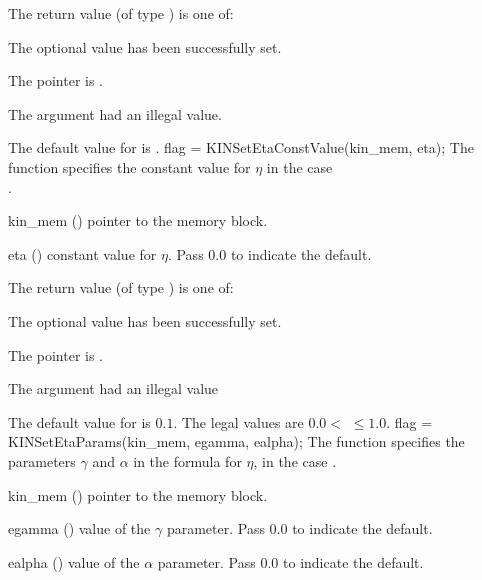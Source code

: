 {
  The return value  (of type ) is one of:
  \begin{args}
  \item[\Id{KIN\_SUCCESS}] 
    The optional value has been successfully set.
  \item[\Id{KIN\_MEM\_NULL}]
    The  pointer is .
  \item[\Id{KIN\_ILL\_INPUT}]
    The argument  had an illegal value.
  \end{args}
}
{
  The default value for  is .
}
{
flag = KINSetEtaConstValue(kin\_mem, eta);
}
{
  The function  specifies the constant value
  for $\eta$ in the case \\ .
}
{
  \begin{args}
  \item[kin\_mem] ()
    pointer to the {\kinsol} memory block.
  \item[eta] ()
    constant value for $\eta$.  Pass $0.0$ to indicate the default.
  \end{args}
}
{
  The return value  (of type ) is one of:
  \begin{args}
  \item[\Id{KIN\_SUCCESS}] 
    The optional value has been successfully set.
  \item[\Id{KIN\_MEM\_NULL}]
    The  pointer is .
  \item[\Id{KIN\_ILL\_INPUT}]
    The argument  had an illegal value
  \end{args}
}
{
  The default value for  is $0.1$.
  The legal values are $0.0 <$  $\le 1.0$.
}
{
flag = KINSetEtaParams(kin\_mem, egamma, ealpha);
}
{
  The function  specifies the parameters $\gamma$ and
  $\alpha$ in the formula for $\eta$, in the case .
}
{
  \begin{args}
  \item[kin\_mem] ()
    pointer to the {\kinsol} memory block.
  \item[egamma] ()
    value of the $\gamma$ parameter.  Pass $0.0$ to indicate the default.
  \item[ealpha] ()
    value of the $\alpha$ parameter.  Pass $0.0$ to indicate the default.
  \end{args}
}

